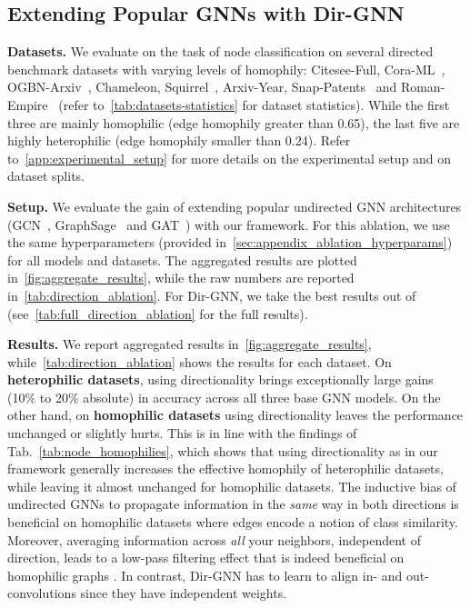 \documentclass{article}
\newcommand\oursacro{Dir-GNN}
\theoremstyle{plain}
\theoremstyle{definition}
\theoremstyle{remark}
\begin{document}
\subsection{Extending Popular GNNs with \oursacro{}}
\label{sec:experiments_extending_gnn}

\textbf{Datasets.} We evaluate on the task of node classification on several directed benchmark datasets with varying levels of homophily: Citesee-Full, Cora-ML~\cite{bojchevski2018deep}, OGBN-Arxiv~\cite{hu2020ogb}, Chameleon, Squirrel~\cite{pei2020geom}, Arxiv-Year, Snap-Patents~\cite{lim2021large} and Roman-Empire~\cite{platonov2023a} (refer to~\cref{tab:datasets-statistics} for dataset statistics). While the first three are mainly homophilic (edge homophily greater than 0.65), the last five are highly heterophilic (edge homophily smaller than 0.24). Refer to~\cref{app:experimental_setup} for more details on the experimental setup and on dataset splits.

\textbf{Setup.} We evaluate the gain of extending popular undirected GNN architectures (GCN~\cite{kipf2016semi}, GraphSage~\cite{hamilton2017inductive} and GAT~\cite{velivckovic2017graph}) with our framework. For this ablation, we use the same hyperparameters (provided in~\cref{sec:appendix_ablation_hyperparams}) for all models and datasets. The aggregated results are plotted in~\cref{fig:aggregate_results}, while the raw numbers are reported in~\cref{tab:direction_ablation}. For \oursacro{}, we take the best results out of  (see~\cref{tab:full_direction_ablation} for the full results).

\textbf{Results.} We report aggregated results in~\cref{fig:aggregate_results}, while~\cref{tab:direction_ablation} shows the results for each dataset. On \textbf{heterophilic datasets}, using directionality brings exceptionally large gains (10\% to 20\% absolute) in accuracy across all three base GNN models. On the other hand, on \textbf{homophilic datasets} using directionality leaves the performance unchanged or slightly hurts. This is in line with the findings of Tab.~\ref{tab:node_homophilies}, which shows that using directionality as in our framework generally increases the effective homophily of heterophilic datasets, while leaving it almost unchanged for homophilic datasets. 
The inductive bias of undirected GNNs to propagate information in the \emph{same} way in both directions is beneficial on homophilic datasets where edges encode a notion of class similarity. Moreover, averaging information across {\em all} your neighbors, independent of direction, leads to a low-pass filtering effect that is indeed beneficial on homophilic graphs \cite{nt2019revisiting}. In contrast, \oursacro{} has to learn to align in- and out-convolutions since they have independent weights.
\end{document}
